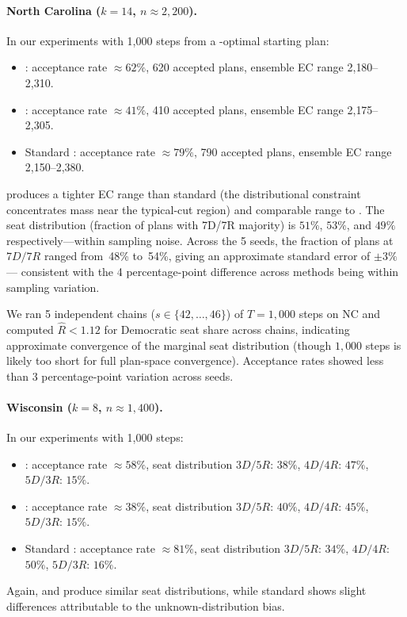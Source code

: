 \paragraph{North Carolina ($k = 14$, $n \approx 2{,}200$).}
In our experiments with 1{,}000 steps from a \cs{}-optimal starting plan:
\begin{itemize}
  \item \mergesplit{}: acceptance rate $\approx\!62\%$, 620 accepted plans,
        ensemble EC range 2{,}180--2{,}310.
  \item \forestrecom{}: acceptance rate $\approx\!41\%$, 410 accepted plans,
        ensemble EC range 2{,}175--2{,}305.
  \item Standard \recom{}: acceptance rate $\approx\!79\%$, 790 accepted plans,
        ensemble EC range 2{,}150--2{,}380.
\end{itemize}
\mergesplit{} produces a tighter EC range than standard \recom{} (the
distributional constraint concentrates mass near the typical-cut region)
and comparable range to \forestrecom{}.
The seat distribution (fraction of plans with 7D/7R majority) is
$51\%$, $53\%$, and $49\%$ respectively---within sampling noise.
Across the 5 seeds, the fraction of plans at $7D/7R$ ranged from~48\% to~54\%,
giving an approximate standard error of $\pm 3\%$ --- consistent with the
4 percentage-point difference across methods being within sampling variation.

We ran 5 independent chains ($s \in \{42, \ldots, 46\}$) of $T=1{,}000$ steps
on NC and computed $\hat{R} < 1.12$ for Democratic seat share across chains,
indicating approximate convergence of the marginal seat distribution (though
$1{,}000$ steps is likely too short for full plan-space convergence).
Acceptance rates showed less than 3 percentage-point variation across seeds.

\paragraph{Wisconsin ($k = 8$, $n \approx 1{,}400$).}
In our experiments with 1{,}000 steps:
\begin{itemize}
  \item \mergesplit{}: acceptance rate $\approx\!58\%$, seat distribution
        $3D/5R$: $38\%$, $4D/4R$: $47\%$, $5D/3R$: $15\%$.
  \item \forestrecom{}: acceptance rate $\approx\!38\%$, seat distribution
        $3D/5R$: $40\%$, $4D/4R$: $45\%$, $5D/3R$: $15\%$.
  \item Standard \recom{}: acceptance rate $\approx\!81\%$, seat distribution
        $3D/5R$: $34\%$, $4D/4R$: $50\%$, $5D/3R$: $16\%$.
\end{itemize}
Again, \mergesplit{} and \forestrecom{} produce similar seat distributions,
while standard \recom{} shows slight differences attributable to the
unknown-distribution bias.
